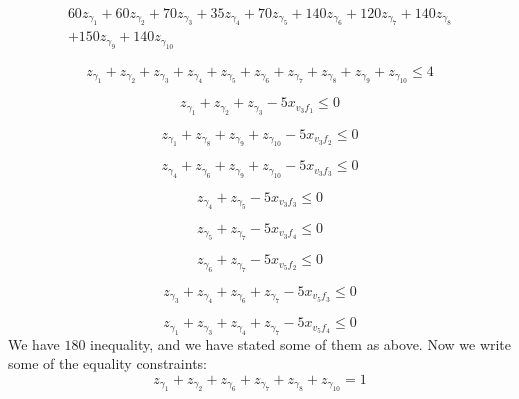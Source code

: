 \documentclass[12pt]{article}
\begin{document}
\begin{equation}
	\begin{split}			60z_{\gamma_1}+60z_{\gamma_2}+70z_{\gamma_3}+35z_{\gamma_4}+70z_{\gamma_5}+140z_{\gamma_6}+120z_{\gamma_7}+140z_{\gamma_8}\\
+150z_{\gamma_9}+140z_{\gamma_{10}}
	\end{split}			
\end{equation}

\begin{equation}			
z_{\gamma_1}+z_{\gamma_2}+z_{\gamma_3}+z_{\gamma_4}+z_{\gamma_5}+z_{\gamma_6}+z_{\gamma_7}+z_{\gamma_8}
+z_{\gamma_9}+z_{\gamma_{10}}\leq4		
\end{equation}

\begin{equation}			
z_{\gamma_1}+z_{\gamma_2}+z_{\gamma_3}-5x_{v_3f_1}	\leq0	
\end{equation}

\begin{equation}			
z_{\gamma_1}+z_{\gamma_8}+z_{\gamma_9}+z_{\gamma_{10}}-5x_{v_3f_2}	\leq0
\end{equation}

\begin{equation}			
z_{\gamma_4}+z_{\gamma_6}+z_{\gamma_9}+z_{\gamma_{10}}-5x_{v_3f_3}	\leq0
\end{equation}

\begin{equation}			
z_{\gamma_4}+z_{\gamma_5}-5x_{v_3f_3}	\leq0
\end{equation}

\begin{equation}	
z_{\gamma_5}+z_{\gamma_7}-5x_{v_3f_4}	\leq0
\end{equation}

\begin{equation}	
z_{\gamma_6}+z_{\gamma_7}-5x_{v_5f_2}	\leq0
\end{equation}

\begin{equation}	
z_{\gamma_3}+z_{\gamma_4}+z_{\gamma_6}+z_{\gamma_7}-5x_{v_5f_3}	\leq0
\end{equation}

\begin{equation}	
z_{\gamma_1}+z_{\gamma_3}+z_{\gamma_4}+z_{\gamma_7}-5x_{v_5f_4}	\leq0
\end{equation}
We have $180$ inequality, and we have stated some of them as above.
Now we write some of the equality constraints:
\begin{equation}	
z_{\gamma_1}+z_{\gamma_2}+z_{\gamma_6}+z_{\gamma_7}+
z_{\gamma_8}+z_{\gamma_{10}}	=1
\end{equation}
\end{document}
